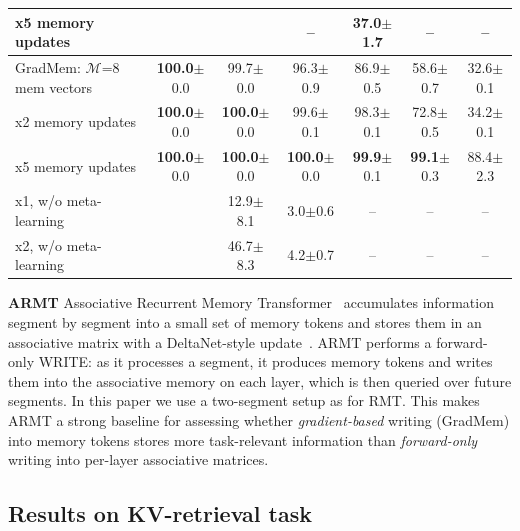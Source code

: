 \documentclass{article}
\theoremstyle{plain}
\theoremstyle{definition}
\theoremstyle{remark}
\begin{document}
{\begin{table}[h]
\begin{center}
\begin{small}
\begin{sc}
{\begin{tabular}{lcccccc}
\hfill x5 memory updates &  &  & -- & 37.0{\tiny$\pm$1.7} & -- & -- \\
\midrule
GradMem: $\mathcal{M}$=8 mem vectors & \textbf{100.0}{\tiny$\pm$0.0} & 99.7{\tiny$\pm$0.0} & 96.3{\tiny$\pm$0.9} & 86.9{\tiny$\pm$0.5} & 58.6{\tiny$\pm$0.7} & 32.6{\tiny$\pm$0.1} \\
\hfill x2 memory updates & \textbf{100.0}{\tiny$\pm$0.0} & \textbf{100.0}{\tiny$\pm$0.0} & 99.6{\tiny$\pm$0.1} & 98.3{\tiny$\pm$0.1} & 72.8{\tiny$\pm$0.5} & 34.2{\tiny$\pm$0.1} \\
\hfill x5 memory updates & \textbf{100.0}{\tiny$\pm$0.0} & \textbf{100.0}{\tiny$\pm$0.0} & \textbf{100.0}{\tiny$\pm$0.0} & \textbf{99.9}{\tiny$\pm$0.1} & \textbf{99.1}{\tiny$\pm$0.3} & 88.4{\tiny$\pm$2.3} \\
\hfill x1, w/o meta-learning &  & 12.9{\tiny$\pm$8.1} & 3.0{\tiny$\pm$0.6} & -- & -- & -- \\
\hfill x2, w/o meta-learning &  & 46.7{\tiny$\pm$8.3} & 4.2{\tiny$\pm$0.7} & -- & -- & -- \\
\bottomrule
\end{tabular}
}
\end{sc}
\end{small}
\end{center}
\vspace{-0.2in}
\end{table}

\textbf{ARMT}
Associative Recurrent Memory Transformer~\citep{rodkin2024associative} accumulates information  segment by segment into a small set of memory tokens and stores them in an associative matrix with a DeltaNet-style update~\citep{yang2024parallelizing}.
ARMT performs a forward-only WRITE: as it processes a segment, it produces memory tokens and writes them into the associative memory on each layer, which is then queried over future segments.
In this paper we use a two-segment setup as for RMT.
This makes ARMT a strong baseline for assessing whether \emph{gradient-based} writing (GradMem) into memory tokens stores more task-relevant information than \emph{forward-only} writing into per-layer associative matrices.







\subsection{Results on KV-retrieval task}
\label{sec:kv_retrieval_results}

}
\end{document}
